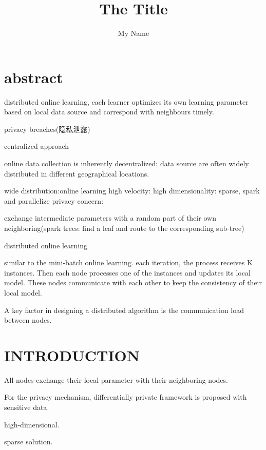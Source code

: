 \documentclass{article}
\author{My Name}
\title{The Title}
\begin{document}
	\section{abstract}
	distributed online learning,
	each learner optimizes its own learning parameter based on local data source and correspond with neighbours timely.
	
	privacy breaches(隐私泄露)
	
	centralized approach
	
	online data collection is inherently decentralized: data source are often widely distributed in different geographical locations.
	
	wide distribution:online learning
	high velocity:
	high dimensionality: sparse, spark and parallelize
	privacy concern: 
	
	exchange intermediate parameters with a random part of their own neighboring(spark trees: find a leaf and route to the corresponding sub-tree)
	
	distributed online learning
	
	similar to the mini-batch online learning. each iteration, the process receives K instances. Then each node processes one of the instances and updates its local model.
	These nodes communicate with each other to keep the consistency of their local model.
	
	A key factor in designing a distributed algorithm is the communication load between nodes.
	
	\section{INTRODUCTION}
	All nodes exchange their local parameter with their neighboring nodes.
	
	{\color{purple} For the privacy mechanism, differentially private framework is proposed with sensitive data}
	
	high-dimensional. 
	
	sparse solution.
	
\end{document}
